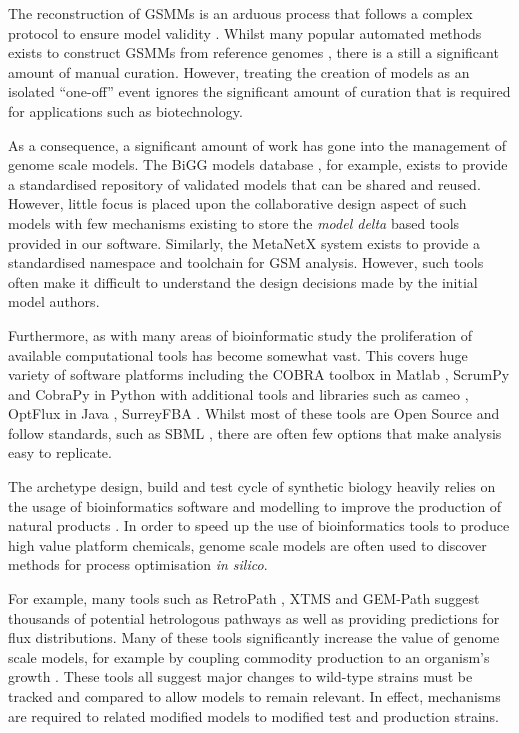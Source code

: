 \documentclass[a4paper,10pt]{article}
\begin{document}
The reconstruction of GSMMs is an arduous process that follows a complex protocol to ensure model validity \cite{thiele2010protocol}.
Whilst many popular automated methods exists to construct GSMMs from reference genomes \cite{henry2010high, poolman2006scrumpy}, there is a still a significant amount of manual curation.
However, treating the creation of models as an isolated ``one-off'' event ignores the significant amount of curation that is required for applications such as biotechnology.

As a consequence, a significant amount of work has gone into the management of genome scale models.
The BiGG models database \cite{king2015bigg}, for example, exists to provide a standardised repository of validated models that can be shared and reused.
However, little focus is placed upon the collaborative design aspect of such models with few mechanisms existing to store the \textit{model delta} based tools provided in our software.
Similarly, the MetaNetX \cite{moretti2016metanetx} system exists to provide a standardised namespace and toolchain for GSM analysis.
However, such tools often make it difficult to understand the design decisions made by the initial model authors.

Furthermore, as with many areas of bioinformatic study the proliferation of available computational tools has become somewhat vast.
This covers huge variety of software platforms including the COBRA toolbox in Matlab \cite{schellenberger2011quantitative}, ScrumPy and CobraPy in Python \cite{poolman2006scrumpy, ebrahim2013cobrapy} with additional tools and libraries such as cameo \cite{cardoso2017cameo}, OptFlux in Java \cite{rocha2010optflux}, SurreyFBA \cite{gevorgyan2010surreyfba}.
Whilst most of these tools are Open Source and follow standards, such as SBML \cite{finney2003systems}, there are often few options that make analysis easy to replicate.

The archetype design, build and test cycle of synthetic biology heavily relies on the usage of bioinformatics software and modelling to improve the production of natural products \cite{carbonell2016bioinformatics}.
In order to speed up the use of bioinformatics tools to produce high value platform chemicals, genome scale models are often used to discover methods for process optimisation \textit{in silico}.

For example, many tools such as RetroPath \cite{carbonell2013retropath}, XTMS \cite{carbonell2014xtms} and GEM-Path \cite{campodonico2014generation} suggest thousands of potential hetrologous pathways as well as providing predictions for flux distributions.
Many of these tools significantly increase the value of genome scale models, for example by coupling commodity production to an organism's growth \cite{feist2010model}.
These tools all suggest major changes to wild-type strains must be tracked and compared to allow models to remain relevant.
In effect, mechanisms are required to related modified models to modified test and production strains.
\end{document}
